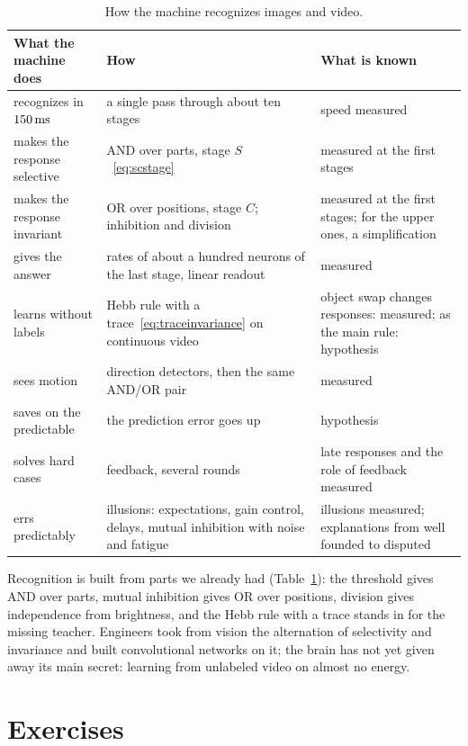 \begin{table}[t]
\centering
\footnotesize
\setlength{\tabcolsep}{4pt}
\renewcommand{\arraystretch}{1.15}
\begin{tabular}{>{\raggedright}p{3.0cm}>{\raggedright}p{4.6cm}>{\raggedright\arraybackslash}p{5.2cm}}
\toprule
What the machine does & How & What is known \\
\midrule
recognizes in $150\,\text{ms}$ & a single pass through about ten stages & speed measured \\
makes the response selective & AND over parts, stage $S$~\eqref{eq:scstage} & measured at the first stages \\
makes the response invariant & OR over positions, stage $C$; inhibition and division & measured at the first stages; for the upper ones, a simplification \\
gives the answer & rates of about a hundred neurons of the last stage, linear readout & measured \\
learns without labels & Hebb rule with a trace~\eqref{eq:traceinvariance} on continuous video & object swap changes responses: measured; as the main rule: hypothesis \\
sees motion & direction detectors, then the same AND/OR pair & measured \\
saves on the predictable & the prediction error goes up & hypothesis \\
solves hard cases & feedback, several rounds & late responses and the role of feedback measured \\
errs predictably & illusions: expectations, gain control, delays, mutual inhibition with noise and fatigue & illusions measured; explanations from well founded to disputed \\
\bottomrule
\end{tabular}
\caption{How the machine recognizes images and video.}
\label{tab:recognition}
\end{table}

Recognition is built from parts we already had (Table~\ref{tab:recognition}): the threshold gives AND over parts, mutual inhibition gives OR over positions, division gives independence from brightness, and the Hebb rule with a trace stands in for the missing teacher. Engineers took from vision the alternation of selectivity and invariance and built convolutional networks on it; the brain has not yet given away its main secret: learning from unlabeled video on almost no energy.

\section{Exercises}

